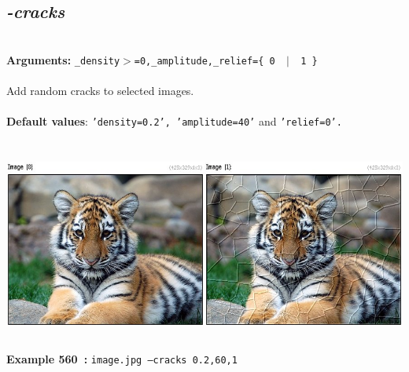 \documentclass[a4paper,11pt,twoside]{book}
\begin{document}
\subsection{\emph{-cracks} }\vspace*{-0.5em}
~\\\textbf{Arguments: } 
{\small \texttt{\_density$>$=0,\_amplitude,\_relief=\{ 0 ~$|$~ 1 \}}}\\~\\
Add random cracks to selected images.
~\\~\\\textbf{Default values}: {\small \texttt{'density=0.2', 'amplitude=40'} and \texttt{'relief=0'.}}
\begin{center}\includegraphics[keepaspectratio=true,height=7cm,width=\textwidth]{img/gmic_def560.jpg}\\
{\footnotesize \textbf{Example 560~:} \texttt{image.jpg --cracks 0.2,60,1}}
\end{center}
\end{document}
